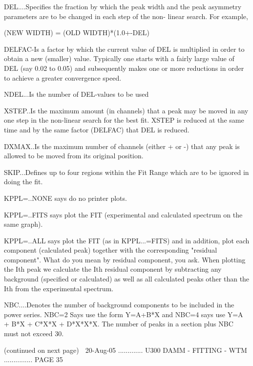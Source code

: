    DEL....Specifies  the  fraction  by  which  the  peak  width  and  the peak
          asymmetry parameters are to be changed in  each  step  of  the  non-
          linear search. For example,
 
                      (NEW WIDTH) = (OLD WIDTH)*(1.0+-DEL)
 
   DELFAC-Is  a  factor  by  which  the  current value of DEL is multiplied in
          order to obtain a new (smaller) value. Typically one starts  with  a
          fairly  large value of DEL (say 0.02 to 0.05) and subsequently makes
          one or more reductions in order to  achieve  a  greater  convergence
          speed.
 
   NDEL...Is the number of DEL-values to be used
 
   XSTEP..Is  the maximum amount (in channels) that a peak may be moved in any
          one step in the  non-linear  search  for  the  best  fit.  XSTEP  is
          reduced  at  the  same time and by the same factor (DELFAC) that DEL
          is reduced.
 
   DXMAX..Is the maximum number of channels (either + or -) that any  peak  is
          allowed to be moved from its original position.
 
   SKIP...Defines  up  to  four  regions  within the Fit Range which are to be
          ignored in doing the fit.
 
   KPPL=..NONE says do no printer plots.
 
   KPPL=..FITS says plot the FIT (experimental and calculated spectrum on  the
          same graph).
 
   KPPL=..ALL  says  plot  the  FIT (as in KPPL...=FITS) and in addition, plot
          each component (calculated peak)  together  with  the  corresponding
          "residual  component".  What  do you mean by residual component, you
          ask. When plotting the  Ith  peak  we  calculate  the  Ith  residual
          component  by  subtracting  any background (specified or calculated)
          as well as  all  calculated  peaks  other  than  the  Ith  from  the
          experimental spectrum.
 
   NBC....Denotes  the  number  of background components to be included in the
          power series. NBC=2 Says use the form Y=A+B*X  and  NBC=4  says  use
          Y=A  +  B*X + C*X*X + D*X*X*X. The number of peaks in a section plus
          NBC must not exceed 30.
 
                            (continued on next page)
    
   20-Aug-05 ............. U300  DAMM - FITTING - WTM ............... PAGE  35
 
